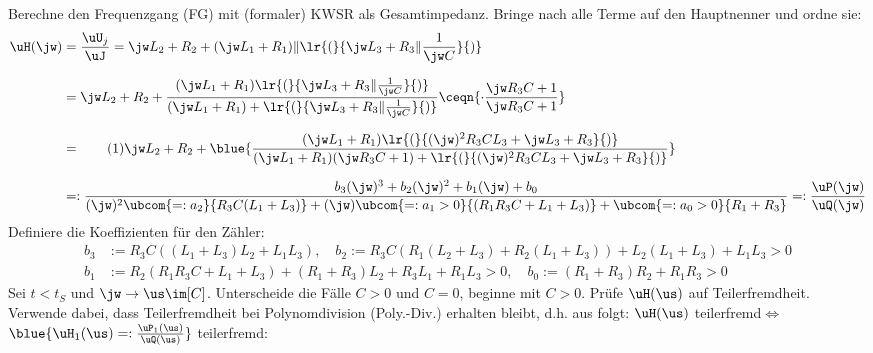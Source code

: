 %
\newcommand{\defaultPath}{/run/media/lvdw/DATA/docs/latex_def/}




%

\allowdisplaybreaks
\reversemarginpar
\newcommand{\numberthis}[1]{%
	\stepcounter{equation}\tag{\theequation}\label{#1}%
}%

%
%
%
\noindent Berechne den Frequenzgang (FG) mit (formaler) KWSR als Gesamtimpedanz. Bringe nach  alle Terme auf den Hauptnenner und ordne sie:
\begin{align*}%
	\uH(\jw)&=\frac{\uU_j}{\uJ}=\jw L_2+R_2+(\jw L_1+R_1)\|\lr{(}{%
		\jw L_3+R_3\|\frac{1}{\jw C}%
	}{)}\\[2.5mm]%
%
	&=\jw L_2+R_2+\frac{%
		(\jw L_1+R_1)\lr{(}{%
			\jw L_3+R_3\|\frac{1}{\jw C}%
		}{)}
	}{%
		(\jw L_1+R_1)+\lr{(}{%
			\jw L_3+R_3\|\frac{1}{\jw C}%
		}{)}%
	}\ceqn{%
		\cdot\frac{\jw R_3C+1}{\jw R_3C+1}%
	}\\[2.5mm]%
%
	&=\numberthis{a1a_FG_Poly1}\jw L_2+R_2+\blue{\frac{%
		(\jw L_1+R_1)\lr{(}{%
			(\jw)^2R_3CL_3+\jw L_3+R_3%
		}{)}%
	}{%
		(\jw L_1+R_1)(\jw R_3C+1)+\lr{(}{%
			(\jw)^2R_3CL_3+\jw L_3+R_3%
		}{)}%
	}}\\[2.5mm]%
%
	&=:\frac{%
		b_3(\jw)^3+b_2(\jw)^2+b_1(\jw)+b_0%
	}{%
		(\jw)^2\ubcom{=:a_2}{R_3C(L_1+L_3)}+(\jw)\ubcom{=:a_1>0}{(R_1R_3C+L_1+L_3)}+\ubcom{=:a_0>0}{R_1+R_3}%
	}=:\frac{\uP(\jw)}{\uQ(\jw)}%
\end{align*}
%
Definiere die Koeffizienten für den Zähler:
\begin{align*}
	b_3&:=R_3C((L_1+L_3)L_2+L_1L_3),\quad b_2:=R_3C(R_1(L_2+L_3)+R_2(L_1+L_3))+L_2(L_1+L_3)+L_1L_3>0\\[2.5mm]%
%
	b_1&:=R_2(R_1R_3C+L_1+L_3)+(R_1+R_3)L_2+R_3L_1+R_1L_3>0,\quad b_0:=(R_1+R_3)R_2+R_1R_3>0%
\end{align*}%
%
%
%
Sei $t<t_S$ und $\jw\rightarrow\us\im[C]$. Unterscheide die Fälle $C>0$ und $C=0$, beginne mit $C>0$. Prüfe $\uH(\us)$ auf Teilerfremdheit. Verwende dabei, dass Teilerfremdheit bei Polynomdivision (Poly.-Div.) erhalten bleibt, d.h. aus  folgt: \glqq$\uH(\us)$ teilerfremd\grqq $\Leftrightarrow$ \glqq$\blue{%
	\uH_1(\us)=:\frac{\uP_1(\us)}{\uQ(\us)}%
}$ teilerfremd\grqq:
